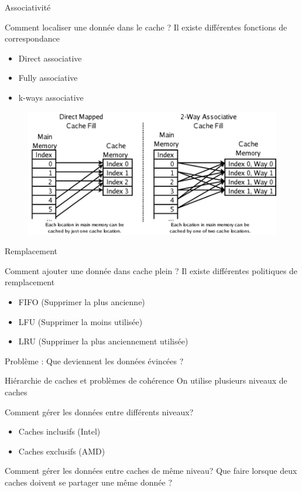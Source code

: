 \begin{frame}{Associativité}
	\begin{block}{Comment localiser une donnée dans le cache ?}
		Il existe différentes fonctions de correspondance
		\begin{itemize}
			\item{Direct associative}
			\item{Fully associative}
			\item{k-ways associative}
		\end{itemize}
	\end{block}
	\begin{figure}[h!]
		\includegraphics[scale=.4]{images/associative.png}
	\end{figure}
\end{frame}

\begin{frame}{Remplacement}
	\begin{block}{Comment ajouter une donnée dans cache plein ?}
		Il existe différentes politiques de remplacement
		\begin{itemize}
			\item{FIFO (Supprimer la plus ancienne)}
			\item{LFU (Supprimer la moins utilisée)}
			\item{LRU (Supprimer la plus anciennement utilisée)}
		\end{itemize}
	\end{block}
	Problème : Que deviennent les données évincées ?
\end{frame}

\begin{frame}{Hiérarchie de caches et problèmes de cohérence}
On utilise plusieurs niveaux de caches
\begin{block}{Comment gérer les données entre différents niveaux?}
		\begin{itemize}
			\item{Caches inclusifs (Intel)}
			\item{Caches exclusifs (AMD)}
		\end{itemize}
	\end{block}
	\begin{block}{Comment gérer les données entre caches de même niveau?}
		Que faire lorsque deux caches doivent se partager une même donnée ?
	\end{block}
\end{frame}
